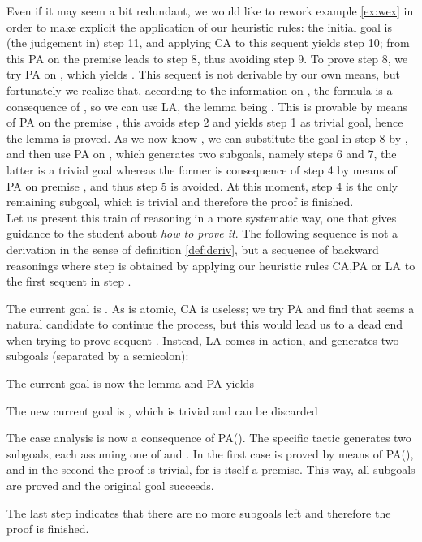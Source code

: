 \documentclass[a4paper,UKenglish]{lipics}
\begin{document}
Even if it may seem a bit redundant, we would like to rework example \ref{ex:wex} in order to make explicit the application of our heuristic rules:
the initial goal is (the judgement in) step 11, and applying CA to this sequent yields step 10; from this PA on the premise  leads to step 8, thus avoiding step 9. To prove step 8, we try PA on , which yields . This sequent is not derivable by our own means, but fortunately we realize that, according to the information on , the formula  is a consequence of , so we can use LA, the lemma being . This is provable by means of PA on the premise , this avoids step 2 and yields step 1 as trivial goal, hence the lemma is proved. As we now know , we can substitute the goal in step 8 by , and then use PA on , which generates two subgoals, namely steps 6 and 7, the latter is a trivial goal whereas the former is consequence of step 4 by means of PA on premise , and thus step 5 is avoided. At this moment, step 4 is the only remaining subgoal, which is trivial and therefore the proof is 
finished. \\


Let us present this train of reasoning in a more systematic way, one that gives guidance to the student about {\em how to prove it}. The following sequence is not a derivation in the sense of definition \ref{def:deriv}, but a sequence of backward reasonings where step  is obtained by applying our heuristic rules CA,PA or LA to the first sequent in step .


The current goal is . As  is atomic, CA is useless; we try PA and find that  seems a natural candidate to continue the process, but this would lead us to a dead end when trying to prove sequent . Instead, LA comes in action, and generates two subgoals (separated by a semicolon):


\noindent The current goal is now the lemma  and PA yields


\noindent The new current goal is , which is trivial and can be discarded


\noindent The case analysis is now a consequence of PA(). The specific tactic generates two subgoals, each assuming one of  and . In the first case  is proved by means of PA(), and in the second the proof is trivial, for  is itself a premise. This way, all subgoals are proved and the original goal succeeds.


The last step indicates that there are no more subgoals left and therefore the proof is finished. \\
\end{document}
